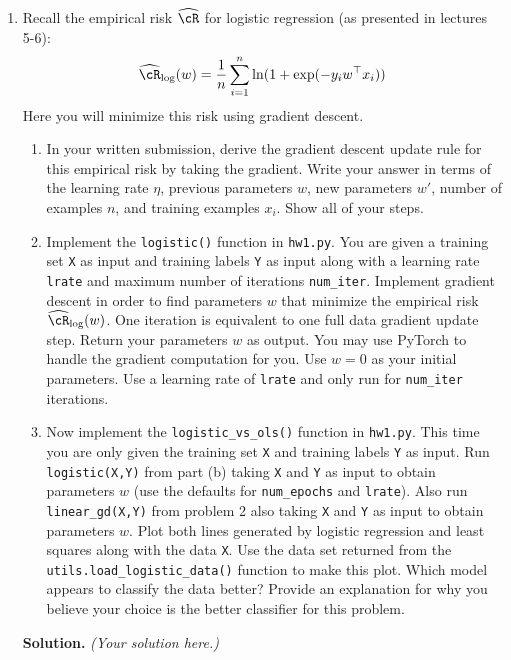 \documentclass{article}
\def\hcR{\widehat{\cR}}
\theoremstyle{definition}
\theoremstyle{remark}
\newenvironment{Q}
        {%
          \clearpage
          \item
        }
        {%
          \phantom{s} %
          \bigskip
          \textbf{Solution.}
        }
\begin{document}
\begin{enumerate}
\begin{Q}
          Recall the empirical risk $\hcR$ for logistic regression (as presented in lectures 5-6):
          \begin{align*}
          \hcR_{\log}(w) = \frac{1}{n} \sum_{i=1}^n \ln ( 1 + \exp( - y_i w^\top x_i ) )
          \end{align*}
          Here you will minimize this risk using gradient descent.
          \begin{enumerate}
          \item In your written submission, derive the gradient descent update rule for this empirical risk by taking the gradient.  Write your answer in terms of the learning rate $\eta$, previous parameters $w$, new parameters $w'$, number of examples $n$, and training examples $x_i$.  Show all of your steps.
          \item Implement the \texttt{logistic()} function in \texttt{hw1.py}.  You are given a training set \texttt{X} as input and training labels \texttt{Y} as input along with a learning rate \texttt{lrate} and maximum number of iterations \texttt{num\_iter}.  Implement gradient descent in order to find parameters $w$ that minimize the empirical risk $\hcR_{\log}(w)$.  One iteration is equivalent to one full data gradient update step.  Return your parameters $w$ as output.  You may use PyTorch to handle the gradient computation for you.  Use $w = 0$ as your initial parameters.  Use a learning rate of \texttt{lrate} and only run for \texttt{num\_iter} iterations.
          \item Now implement the \texttt{logistic\_vs\_ols()} function in \texttt{hw1.py}.  This time you are only given the training set \texttt{X} and training labels \texttt{Y} as input.  Run \texttt{logistic(X,Y)} from part (b) taking \texttt{X} and \texttt{Y} as input to obtain parameters $w$ (use the defaults for \texttt{num\_epochs} and \texttt{lrate}).  Also run \texttt{linear\_gd(X,Y)} from problem 2 also taking \texttt{X} and \texttt{Y} as input to obtain parameters $w$.  Plot both lines generated by logistic regression and least squares along with the data \texttt{X}. Use the data set returned from the \texttt{utils.load\_logistic\_data()} function to make this plot. Which model appears to classify the data better? Provide an explanation for why you believe your choice is the better classifier for this problem.
          \end{enumerate}
          \end{Q}
          \emph{(Your solution here.)}
        \end{enumerate}


        
\end{document}
